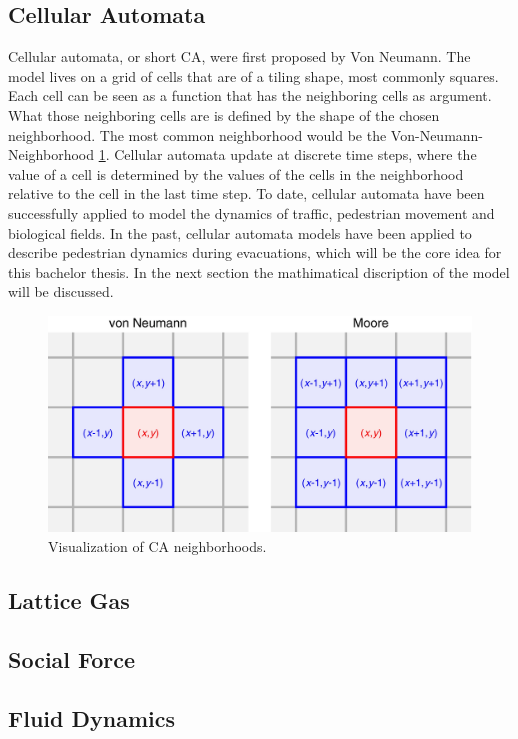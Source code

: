 \subsection{Cellular Automata}
Cellular automata, or short CA, were first proposed by Von Neumann. 
The model lives on a grid of cells that are of a tiling shape, most commonly squares.
Each cell can be seen as a function that has the neighboring cells as argument. 
What those neighboring cells are is defined by the shape of the chosen neighborhood. 
The most common neighborhood would be the Von-Neumann-Neighborhood \ref{abb:pic1}.
Cellular automata update at discrete time steps, 
where the value of a cell is determined by the values of the cells in the neighborhood 
relative to the cell in the last time step. 
To date, cellular automata have been successfully applied to model the dynamics of traffic, pedestrian movement and biological fields. 
In the past, cellular automata models have been applied to describe pedestrian dynamics during evacuations, which will be the core idea for this bachelor thesis.
In the next section the mathimatical discription of the model will be discussed. 

\begin{figure}[h] %
   \centering %
   \includegraphics[width=0.8\linewidth]{content/figures/CA_Umgebungen.png} 
   \caption{Visualization of CA neighborhoods.}
   \label{abb:pic1}
\end{figure}

\subsection{Lattice Gas}
\subsection{Social Force}
\subsection{Fluid Dynamics}
